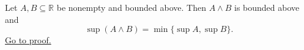 \begin{theorem}
\label{thm:supremum-pairwise-minimum-set}
Let $A,B\subseteq\mathbb{R}$ be nonempty and bounded above. Then $A\wedge B$
is bounded above and
\[
\sup(A\wedge B)=\min\{\sup A,\sup B\}.
\]
\hyperref[prf:supremum-pairwise-minimum-set]{Go to proof.}
\end{theorem}